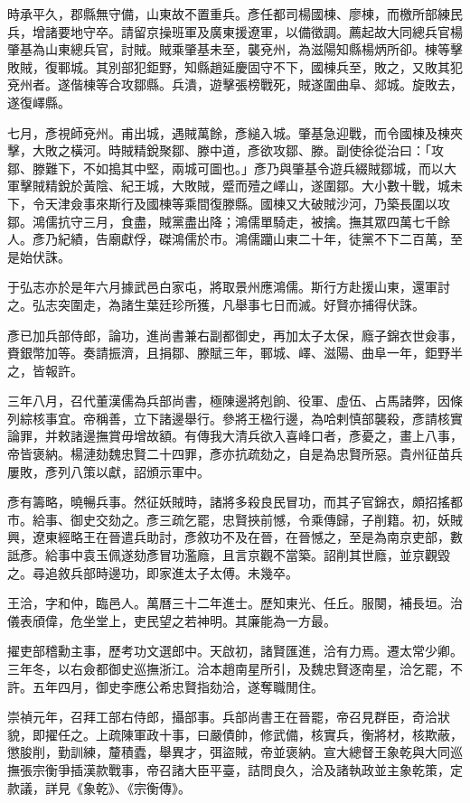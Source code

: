 \begin{pinyinscope}
時承平久，郡縣無守備，山東故不置重兵。彥任都司楊國棟、廖棟，而檄所部練民兵，增諸要地守卒。請留京操班軍及廣東援遼軍，以備徵調。薦起故大同總兵官楊肇基為山東總兵官，討賊。賊乘肇基未至，襲兗州，為滋陽知縣楊炳所卻。棟等擊敗賊，復鄆城。其別部犯鉅野，知縣趙延慶固守不下，國棟兵至，敗之，又敗其犯兗州者。遂偕棟等合攻鄒縣。兵潰，遊擊張榜戰死，賊遂圍曲阜、郯城。旋敗去，遂復嶧縣。

七月，彥視師兗州。甫出城，遇賊萬餘，彥縋入城。肇基急迎戰，而令國棟及棟夾擊，大敗之橫河。時賊精銳聚鄒、滕中道，彥欲攻鄒、滕。副使徐從治曰：「攻鄒、滕難下，不如搗其中堅，兩城可圖也。」彥乃與肇基令遊兵綴賊鄒城，而以大軍擊賊精銳於黃陰、紀王城，大敗賊，蹙而殪之嶧山，遂圍鄒。大小數十戰，城未下，令天津僉事來斯行及國棟等乘間復滕縣。國棟又大破賊沙河，乃築長圍以攻鄒。鴻儒抗守三月，食盡，賊黨盡出降；鴻儒單騎走，被擒。撫其眾四萬七千餘人。彥乃紀績，告廟獻俘，磔鴻儒於市。鴻儒躪山東二十年，徒黨不下二百萬，至是始伏誅。

于弘志亦於是年六月據武邑白家屯，將取景州應鴻儒。斯行方赴援山東，還軍討之。弘志突圍走，為諸生葉廷珍所獲，凡舉事七日而滅。好賢亦捕得伏誅。

彥已加兵部侍郎，論功，進尚書兼右副都御史，再加太子太保，廕子錦衣世僉事，賚銀幣加等。奏請振濟，且捐鄒、滕賦三年，鄆城、嶧、滋陽、曲阜一年，鉅野半之，皆報許。

三年八月，召代董漢儒為兵部尚書，極陳邊將剋餉、役軍、虛伍、占馬諸弊，因條列綜核事宜。帝稱善，立下諸邊舉行。參將王楹行邊，為哈剌慎部襲殺，彥請核實論罪，并敕諸邊撫賞毋增故額。有傳我大清兵欲入喜峰口者，彥憂之，畫上八事，帝皆褒納。楊漣劾魏忠賢二十四罪，彥亦抗疏劾之，自是為忠賢所惡。貴州征苗兵屢敗，彥列八策以獻，詔頒示軍中。

彥有籌略，曉暢兵事。然征妖賊時，諸將多殺良民冒功，而其子官錦衣，頗招搖都市。給事、御史交劾之。彥三疏乞罷，忠賢挾前憾，令乘傳歸，子削籍。初，妖賊興，遼東經略王在晉遣兵助討，彥敘功不及在晉，在晉憾之，至是為南京吏部，數詆彥。給事中袁玉佩遂劾彥冒功濫廕，且言京觀不當築。詔削其世廕，並京觀毀之。尋追敘兵部時邊功，即家進太子太傅。未幾卒。

王洽，字和仲，臨邑人。萬曆三十二年進士。歷知東光、任丘。服闋，補長垣。治儀表頎偉，危坐堂上，吏民望之若神明。其廉能為一方最。

擢吏部稽勳主事，歷考功文選郎中。天啟初，諸賢匯進，洽有力焉。遷太常少卿。三年冬，以右僉都御史巡撫浙江。洽本趙南星所引，及魏忠賢逐南星，洽乞罷，不許。五年四月，御史李應公希忠賢指劾洽，遂奪職閒住。

崇禎元年，召拜工部右侍郎，攝部事。兵部尚書王在晉罷，帝召見群臣，奇洽狀貌，即擢任之。上疏陳軍政十事，曰嚴債帥，修武備，核實兵，衡將材，核欺蔽，懲朘削，勤訓練，釐積蠹，舉異才，弭盜賊，帝並褒納。宣大總督王象乾與大同巡撫張宗衡爭插漢款戰事，帝召諸大臣平臺，詰問良久，洽及諸執政並主象乾策，定款議，詳見《象乾》、《宗衡傳》。


\end{pinyinscope}
